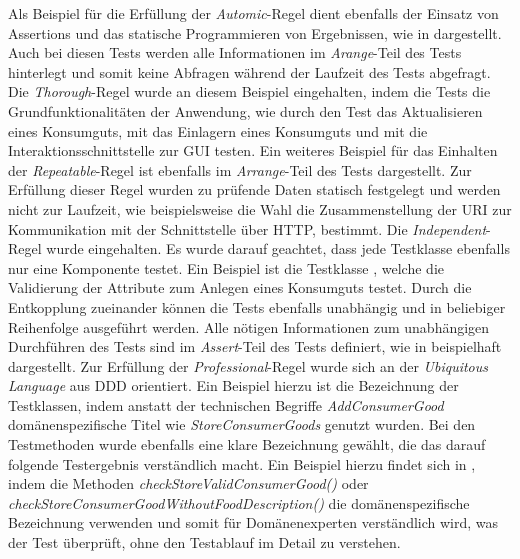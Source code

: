 Als Beispiel für die Erfüllung der \textit{Automic}-Regel dient ebenfalls der Einsatz von Assertions und das statische Programmieren von Ergebnissen, wie in \href{}{\code{}} dargestellt.
Auch bei diesen Tests werden alle Informationen im \textit{Arange}-Teil des Tests hinterlegt und somit keine Abfragen während der Laufzeit des Tests abgefragt.
Die \textit{Thorough}-Regel wurde an diesem Beispiel eingehalten, indem die Tests die Grundfunktionalitäten der Anwendung, wie durch den Test \href{}{\code{}} das Aktualisieren eines Konsumguts, mit \href{}{\code{}} das Einlagern eines Konsumguts und mit \href{}{\code{}} die Interaktionsschnittstelle zur \ac{GUI} testen.
Ein weiteres Beispiel für das Einhalten der \textit{Repeatable}-Regel ist ebenfalls im \textit{Arrange}-Teil des Tests \href{}{\code{}} dargestellt.
Zur Erfüllung dieser Regel wurden zu prüfende Daten statisch festgelegt und werden nicht zur Laufzeit, wie beispielsweise die Wahl die Zusammenstellung der \ac{URI} zur Kommunikation mit der Schnittstelle über \ac{HTTP}, bestimmt.
Die \textit{Independent}-Regel wurde eingehalten.
Es wurde darauf geachtet, dass jede Testklasse ebenfalls nur eine Komponente testet.
Ein Beispiel ist die Testklasse \href{}{\code{}}, welche die Validierung der Attribute zum Anlegen eines Konsumguts testet.
Durch die Entkopplung zueinander können die Tests ebenfalls unabhängig und in beliebiger Reihenfolge ausgeführt werden.
Alle nötigen Informationen zum unabhängigen Durchführen des Tests sind im \textit{Assert}-Teil des Tests definiert, wie in \href{}{\code{}} beispielhaft dargestellt.
Zur Erfüllung der \textit{Professional}-Regel wurde sich an der \textit{Ubiquitous Language} aus \ac{DDD} orientiert. Ein Beispiel hierzu ist die Bezeichnung der Testklassen, indem anstatt der technischen Begriffe \textit{AddConsumerGood} domänenspezifische Titel wie \textit{StoreConsumerGoods} genutzt wurden.
Bei den Testmethoden wurde ebenfalls eine klare Bezeichnung gewählt, die das darauf folgende Testergebnis verständlich macht.
Ein Beispiel hierzu findet sich in \href{}{\code{}}, indem die Methoden \href{}{\code{}}\textit{ checkStoreValidConsumerGood()} oder \href{}{\code{}}\textit{ checkStoreConsumerGoodWithoutFoodDescription()} die domänenspezifische Bezeichnung verwenden und somit für Domänenexperten verständlich wird, was der Test überprüft, ohne den Testablauf im Detail zu verstehen.

